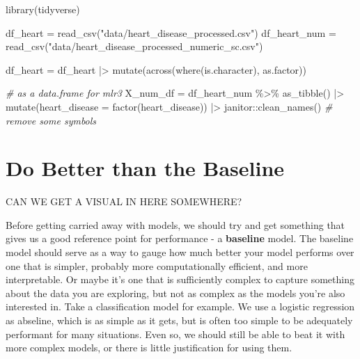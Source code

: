 \documentclass[
  letterpaper,
]{krantz}
\newenvironment{Shaded}{}{}
\newcommand{\AttributeTok}[1]{\textcolor[rgb]{0.49,0.56,0.16}{#1}}
\newcommand{\CommentTok}[1]{\textcolor[rgb]{0.38,0.63,0.69}{\textit{#1}}}
\newcommand{\FunctionTok}[1]{\textcolor[rgb]{0.02,0.16,0.49}{#1}}
\newcommand{\NormalTok}[1]{#1}
\newcommand{\OtherTok}[1]{\textcolor[rgb]{0.00,0.44,0.13}{#1}}
\newcommand{\SpecialCharTok}[1]{\textcolor[rgb]{0.25,0.44,0.63}{#1}}
\newcommand{\StringTok}[1]{\textcolor[rgb]{0.25,0.44,0.63}{#1}}
\begin{document}
\begin{Shaded}
\begin{Highlighting}[]
\FunctionTok{library}\NormalTok{(tidyverse)}

\NormalTok{df\_heart }\OtherTok{=} \FunctionTok{read\_csv}\NormalTok{(}\StringTok{"data/heart\_disease\_processed.csv"}\NormalTok{)}
\NormalTok{df\_heart\_num }\OtherTok{=} \FunctionTok{read\_csv}\NormalTok{(}\StringTok{"data/heart\_disease\_processed\_numeric\_sc.csv"}\NormalTok{)}

\NormalTok{df\_heart }\OtherTok{=}\NormalTok{ df\_heart }\SpecialCharTok{|\textgreater{}} 
    \FunctionTok{mutate}\NormalTok{(}\FunctionTok{across}\NormalTok{(}\FunctionTok{where}\NormalTok{(is.character), as.factor))}

\CommentTok{\# as a data.frame for mlr3}
\NormalTok{X\_num\_df }\OtherTok{=}\NormalTok{ df\_heart\_num }\SpecialCharTok{\%\textgreater{}\%}
    \FunctionTok{as\_tibble}\NormalTok{() }\SpecialCharTok{|\textgreater{}} 
    \FunctionTok{mutate}\NormalTok{(}\AttributeTok{heart\_disease =} \FunctionTok{factor}\NormalTok{(heart\_disease)) }\SpecialCharTok{|\textgreater{}} 
\NormalTok{    janitor}\SpecialCharTok{::}\FunctionTok{clean\_names}\NormalTok{() }\CommentTok{\# remove some symbols}
\end{Highlighting}
\end{Shaded}

\section{Do Better than the Baseline}\label{do-better-than-the-baseline}

CAN WE GET A VISUAL IN HERE SOMEWHERE?

Before getting carried away with models, we should try and get something
that gives us a good reference point for performance - a
\textbf{baseline} model. The baseline model should serve as a way to
gauge how much better your model performs over one that is simpler,
probably more computationally efficient, and more interpretable. Or
maybe it's one that is sufficiently complex to capture something about
the data you are exploring, but not as complex as the models you're also
interested in. Take a classification model for example. We use a
logistic regression as abseline, which is as simple as it gets, but is
often too simple to be adequately performant for many situations. Even
so, we should still be able to beat it with more complex models, or
there is little justification for using them.
\end{document}

